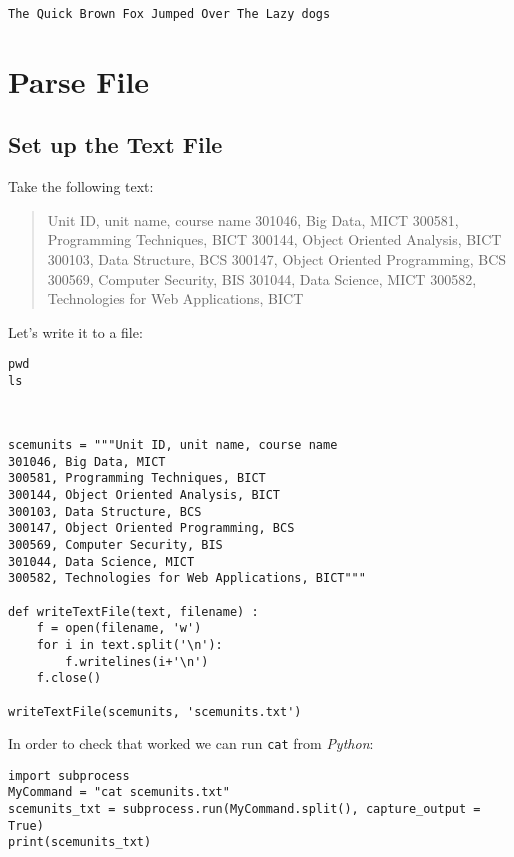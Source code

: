 \documentclass[11pt]{article}
\begin{document}
\begin{verbatim}
The Quick Brown Fox Jumped Over The Lazy dogs
\end{verbatim}

\section{Parse File}
\label{sec:org088dfe5}
\subsection{Set up the Text File}
\label{sec:org4b7a218}

Take the following text:
\begin{quote}
Unit ID, unit name, course name
301046, Big Data, MICT
300581, Programming Techniques, BICT
300144, Object Oriented Analysis, BICT
300103, Data Structure, BCS
300147, Object Oriented Programming, BCS
300569, Computer Security, BIS
301044, Data Science, MICT
300582, Technologies for Web Applications, BICT
\end{quote}

Let's write it to a file:

\begin{verbatim}
pwd
ls
\end{verbatim}

\begin{verbatim}


scemunits = """Unit ID, unit name, course name
301046, Big Data, MICT
300581, Programming Techniques, BICT
300144, Object Oriented Analysis, BICT
300103, Data Structure, BCS
300147, Object Oriented Programming, BCS
300569, Computer Security, BIS
301044, Data Science, MICT
300582, Technologies for Web Applications, BICT"""

def writeTextFile(text, filename) :
    f = open(filename, 'w')
    for i in text.split('\n'):
        f.writelines(i+'\n')
    f.close()

writeTextFile(scemunits, 'scemunits.txt')

\end{verbatim}

In order to check that worked we can run \texttt{cat} from \emph{Python}:

\begin{verbatim}
import subprocess
MyCommand = "cat scemunits.txt"
scemunits_txt = subprocess.run(MyCommand.split(), capture_output = True)
print(scemunits_txt)
\end{verbatim}
\end{document}
